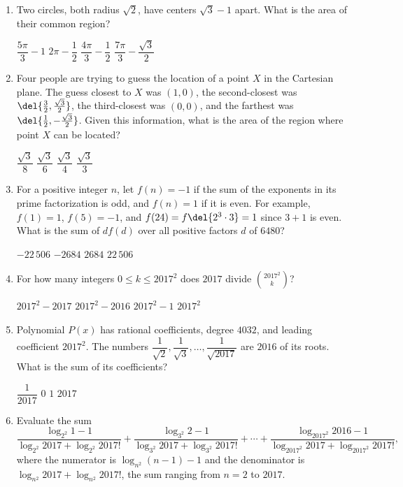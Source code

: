 \documentclass[11pt,paper=letter]{scrartcl}
\begin{document}
\begin{enumerate}[start=3]
  \item Two circles, both radius $\sqrt2$, have centers $\sqrt{3}-1$ apart. What is the area of their common region?

  \fourch
  {$\dfrac{5\pi}3 - 1$}
  {$2\pi - \dfrac12$}
  {$\dfrac{4\pi}3 - \dfrac12$}
  {$\dfrac{7\pi}3 - \dfrac{\sqrt3}2$}

  \item Four people are trying to guess the location of a point $X$ in the Cartesian plane. The guess closest to $X$ was $(1, 0)$, the second-closest was $\del{\frac32, \frac{\sqrt3}2}$, the third-closest was $(0, 0)$, and the farthest was $\del{\frac12, -\frac{\sqrt3}2}$. Given this information, what is the area of the region where point $X$ can be located?

  \fourch
  {$\dfrac{\sqrt3}8$}
  {$\dfrac{\sqrt3}6$}
  {$\dfrac{\sqrt3}4$}
  {$\dfrac{\sqrt3}3$}

  \item For a positive integer $n$, let $f(n) = -1$ if the sum of the exponents in its prime factorization is odd, and $f(n) = 1$ if it is even. For example, $f(1) = 1$, $f(5) = -1$, and $f(24) = f\del{2^3 \cdot 3} = 1$ since $3+1$ is even. What is the sum of $df(d)$ over all positive factors $d$ of $6480$?

  \fourch
  {$-22\,506$}
  {$-2684$}
  {$2684$}
  {$22\,506$}

  \item For how many integers $0 \leq k \leq 2017^2$ does $2017$ divide $\displaystyle \binom{2017^2}{k}$?

  \fourch
  {$2017^2-2017$}
  {$2017^2-2016$}
  {$2017^2-1$}
  {$2017^2$}

  \item Polynomial $P(x)$ has rational coefficients, degree $4032$, and leading coefficient $2017^2$. The numbers $\dfrac1{\sqrt2}, \dfrac1{\sqrt3}, \ldots, \dfrac1{\sqrt{2017}}$ are $2016$ of its roots. What is the sum of its coefficients?

  \fourch
  {$\dfrac{1}{2017}$}
  {$0$}
  {$1$}
  {$2017$}

  \item Evaluate the sum $$\frac{\log_{2^2} 1 - 1}{\log_{2^2} 2017 + \log_{2^2} 2017!} + \frac{\log_{3^2} 2 - 1}{\log_{3^2} 2017 + \log_{3^2} 2017!} + \cdots + \frac{\log_{2017^2} 2016 - 1}{\log_{2017^2} 2017 + \log_{2017^2} 2017!},$$ where the numerator is $\log_{n^2} (n-1) - 1$ and the denominator is $\log_{n^2} 2017 + \log_{n^2} 2017!$, the sum ranging from $n = 2$ to $2017$.


\end{enumerate}
\end{document}
